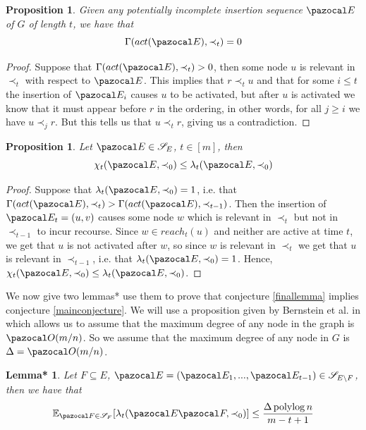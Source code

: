 \documentclass{report}
\newtheorem{proposition}[theorem]{Proposition}
\newtheorem{lemma*}[theorem]{Lemma*}
\DeclareMathOperator*{\polylog}{polylog}
\begin{document}
\begin{proposition}
Given any potentially incomplete insertion sequence $\pazocal E$ of $G$ of length $t$, we have that
\[ \Gamma(act(\pazocal E),\prec_t) = 0 \]
\end{proposition}

\begin{proof}
Suppose that $\Gamma(act(\pazocal E),\prec_t) > 0$, then some node $u$ is relevant in $\prec_t$ with respect to $\pazocal E$. This implies that $r \prec_t u$ and that for some $i \leq t$ the insertion of $\pazocal E_i$ causes $u$ to be activated, but after $u$ is activated we know that it must appear before $r$ in the ordering, in other words, for all $j \geq i$ we have $u \prec_j r$. But this tells us that $u \prec_t r$, giving us a contradiction.
\end{proof}

\begin{proposition}\label{chileqlam}
Let $\pazocal E \in \mathcal S_E$, $t \in [m]$, then \[\chi_t(\pazocal E, \prec_0) \leq \lambda_t(\pazocal E, \prec_0)\]
\end{proposition}

\begin{proof}
Suppose that $\lambda_t(\pazocal E, \prec_0)=1$, i.e. that $\Gamma(act(\pazocal E), \prec_{t}) > \Gamma(act(\pazocal E), \prec_{t-1})$. Then the insertion of $\pazocal E_t = (u,v)$ causes some node $w$ which is relevant in $\prec_t$ but not in $\prec_{t-1}$ to incur recourse. Since $w \in reach_t(u)$ and neither are active at time $t$, we get that $u$ is not activated after $w$, so since $w$ is relevant in $\prec_t$ we get that $u$ is relevant in $\prec_{t-1}$, i.e. that $\lambda_t(\pazocal E, \prec_0) = 1$. Hence, $\chi_t(\pazocal E, \prec_0) \leq \lambda_t(\pazocal E, \prec_0)$.
\end{proof}

We now give two lemmas* use them to prove that conjecture \ref{finallemma} implies conjecture \ref{mainconjecture}. We will use a proposition given by Bernstein et al. in \cite{BernsteinC18} which allows us to assume that the maximum degree of any node in the graph is $\pazocal O(m/n)$. So we assume that the maximum degree of any node in $G$ is $\Delta = \pazocal O(m/n)$.

\begin{lemma*}\label{first reduction lemma}
Let $F \subseteq E$, $\pazocal E = (\pazocal E_1,...,\pazocal E_{t-1}) \in \mathcal S_{E \setminus F}$, then we have that
\[ \mathbb E_{\pazocal F \in \mathcal S_F} [\lambda_t(\pazocal E \pazocal F, \prec_0)] \leq \frac{\Delta\polylog n}{m-t+1} \]
\end{lemma*}
\end{document}

